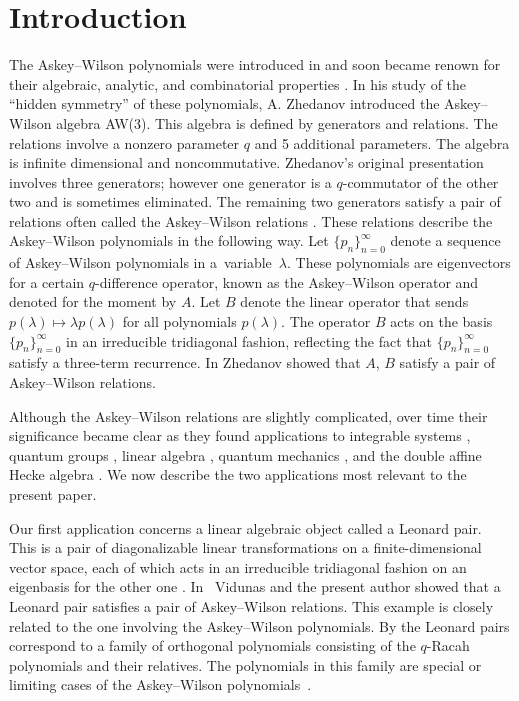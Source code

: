 \documentclass[pdftex]{sigma}
\numberwithin{equation}{section}
\begin{document}


\vspace{-3mm}

\section{Introduction}

The Askey--Wilson polynomials
were introduced in \cite{awpoly} and soon became renown for
their algebraic, analytic, and combinatorial properties
\cite{ismail,koeswa}.
In his study
\cite{zhidd}
of the ``hidden symmetry'' of
these
polynomials,
A. Zhedanov introduced the Askey--Wilson
algebra AW(3).
This algebra is def\/ined
by generators and relations. The relations involve a nonzero
parameter $q$ and 5 additional parameters.
The algebra
is
 inf\/inite dimensional
and noncommutative.
Zhedanov's original presentation
involves three generators;  however one generator is
a $q$-commutator of the other two and is sometimes
eliminated. The remaining two generators
satisfy a pair of relations often called
the Askey--Wilson relations \cite{aw}.
These relations describe the
Askey--Wilson polynomials in
the following way.
Let $\lbrace p_n\rbrace_{n=0}^\infty$
denote a sequence of
Askey--Wilson polynomials
in a~variable~$\lambda$.
These polynomials
 are eigenvectors for
a certain $q$-dif\/ference operator, known
as the Askey--Wilson operator and denoted for the moment by $A$.
Let $B$ denote the linear operator
that sends $p(\lambda) \mapsto \lambda p(\lambda)$
for all polynomials $p(\lambda)$.
The operator $B$ acts on the basis
 $\lbrace p_n\rbrace_{n=0}^\infty$
 in an irreducible tridiagonal fashion,
 ref\/lecting the fact that
 $\lbrace p_n\rbrace_{n=0}^\infty$ satisfy
 a
 three-term recurrence.
In \cite{zhidd} Zhedanov
showed that $A$, $B$ satisfy a pair of Askey--Wilson relations.

Although the Askey--Wilson relations
are slightly complicated,
over time their signif\/icance became clear
as they found applications to
integrable systems
\cite{bas2,lavr,wz},
quantum groups
  \cite{GYZlinear},
linear algebra
\cite{LS99,aw},
quantum mechanics
\cite{odake},
and the double af\/f\/ine Hecke algebra
\cite{koo1,
dahater}.
We now describe the two
applications most  relevant to the present paper.

Our f\/irst application concerns a linear algebraic object
called a Leonard pair. This is a
 pair of diagonalizable linear transformations
on a f\/inite-dimensional vector space, each of which
acts in an irreducible tridiagonal fashion on an eigenbasis for
the other one
\cite[Def\/inition 1.1]{LS99}.
In~\cite{aw} Vidunas and the present author showed that
a Leonard pair satisf\/ies a pair of
Askey--Wilson relations.
This example is closely related to the
one involving the Askey--Wilson
polynomials.  By
\cite[Section~5]{TLT:array}
the Leonard pairs correspond
to a family
of orthogonal polynomials consisting of the $q$-Racah
polynomials and their relatives. The polynomials in this
family
are
special or limiting cases of the Askey--Wilson
polynomials~\cite{koeswa}.
\end{document}
